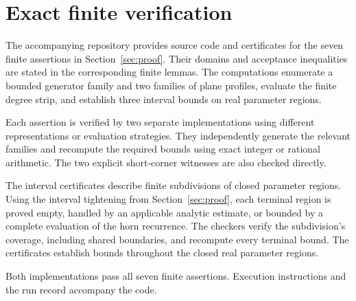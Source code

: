 \section{Exact finite verification}\label{sec:verification}

The accompanying repository provides source code and certificates for
the seven finite assertions in Section~\ref{sec:proof}. Their domains
and acceptance inequalities are stated in the corresponding finite
lemmas. The computations enumerate a bounded generator family and two
families of plane profiles, evaluate the finite degree strip, and
establish three interval bounds on real parameter regions.

Each assertion is verified by two separate implementations using
different representations or evaluation strategies. They independently
generate the relevant families and recompute the required bounds using
exact integer or rational arithmetic. The two explicit short-corner
witnesses are also checked directly.

The interval certificates describe finite subdivisions of closed
parameter regions. Using the interval tightening from
Section~\ref{sec:proof}, each terminal region is proved empty, handled
by an applicable analytic estimate, or bounded by a complete evaluation
of the horn recurrence. The checkers verify the subdivision's coverage,
including shared boundaries, and recompute every terminal bound.
The certificates establish bounds throughout the closed real parameter
regions.

Both implementations pass all seven finite assertions. Execution
instructions and the run record accompany the code.
